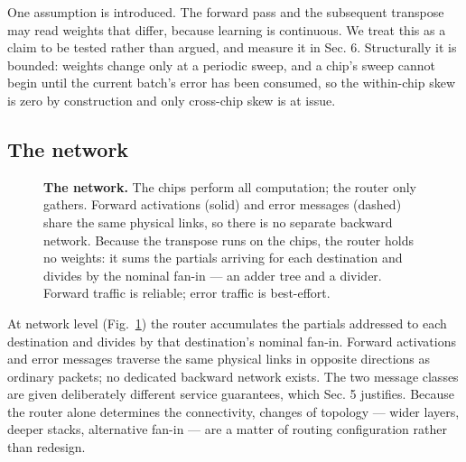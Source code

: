 \documentclass[11pt]{article}
\newcommand{\bdelta}{\bm\delta}
\begin{document}
One assumption is introduced. The forward pass and the subsequent
transpose may read weights that differ, because learning is continuous.
We treat this as a claim to be tested rather than argued, and measure it
in Sec. 6. Structurally it is bounded: weights change only at a periodic
sweep, and a chip's sweep cannot begin until the current batch's error
has been consumed, so the within-chip skew is zero by construction and
only cross-chip skew is at issue.

\hypertarget{sec:network}{%
\subsection{The network}\label{sec:network}}

\begin{figure}[t]
\centering
{}
\caption{\textbf{The network.} The chips perform all computation; the router only gathers. Forward
activations (solid) and error messages (dashed) share the same physical links, so there is no
separate backward network. Because the transpose runs on the chips, the router holds no weights: it
sums the partials arriving for each destination and divides by the nominal fan-in --- an adder tree
and a divider. Forward traffic is reliable; error traffic is best-effort.}
\label{fig:net}
\end{figure}

At network level (Fig.~\ref{fig:net}) the router accumulates the partials addressed
to each destination and divides by that destination's nominal fan-in.
Forward activations and error messages traverse the same physical links
in opposite directions as ordinary packets; no dedicated backward
network exists. The two message classes are given deliberately different
service guarantees, which Sec. 5 justifies. Because the router alone
determines the connectivity, changes of topology --- wider layers,
deeper stacks, alternative fan-in --- are a matter of routing
configuration rather than redesign.
\end{document}
